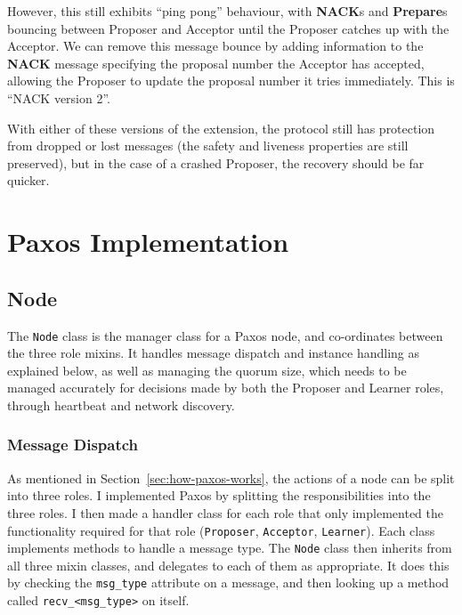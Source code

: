\documentclass[12pt,twoside,notitlepage]{report}
\newcommand{\msg}[1] {{\bf #1}}         %
\begin{document}
However, this still exhibits ``ping pong'' behaviour, with \msg{NACK}s and \msg{Prepare}s bouncing
between Proposer and Acceptor until the Proposer catches up with the Acceptor. We can remove this
message bounce by adding information to the \msg{NACK} message specifying the proposal number the
Acceptor has accepted, allowing the Proposer to update the proposal number it tries immediately.
This is ``NACK version 2''.


With either of these versions of the extension, the protocol still has protection from dropped or
lost messages (the safety and liveness properties are still preserved), but in the case of a
crashed Proposer, the recovery should be far quicker.

\section{Paxos Implementation}

\subsection{Node}

The \verb+Node+ class is the manager class for a Paxos node, and co-ordinates between the three
role mixins. It handles message dispatch and instance handling as explained below, as well as
managing the quorum size, which needs to be managed accurately for decisions made by both the
Proposer and Learner roles, through heartbeat and network discovery.

\subsubsection{Message Dispatch}

As mentioned in Section~\ref{sec:how-paxos-works}, the actions of a node can be split into three
roles. I implemented Paxos by splitting the responsibilities into the three roles. I then made a
handler class for each role that only implemented the functionality required for that role
(\verb+Proposer+, \verb+Acceptor+, \verb+Learner+). Each class implements methods to handle a
message type. The \verb+Node+ class then inherits from all three mixin classes, and delegates to
each of them as appropriate. It does this by checking the \verb+msg_type+ attribute on a message,
and then looking up a method called \verb+recv_<msg_type>+ on itself.
\end{document}
